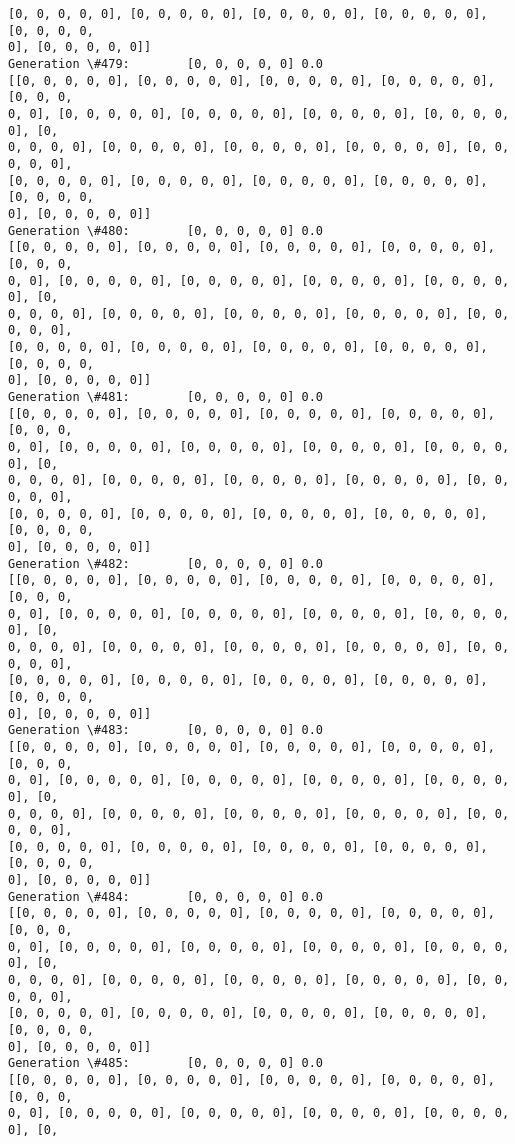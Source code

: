 \documentclass[11pt]{article}
\begin{document}
\begin{Verbatim}[commandchars=\\\{\}]
[0, 0, 0, 0, 0], [0, 0, 0, 0, 0], [0, 0, 0, 0, 0], [0, 0, 0, 0, 0], [0, 0, 0, 0,
0], [0, 0, 0, 0, 0]]
Generation \#479:        [0, 0, 0, 0, 0] 0.0
[[0, 0, 0, 0, 0], [0, 0, 0, 0, 0], [0, 0, 0, 0, 0], [0, 0, 0, 0, 0], [0, 0, 0,
0, 0], [0, 0, 0, 0, 0], [0, 0, 0, 0, 0], [0, 0, 0, 0, 0], [0, 0, 0, 0, 0], [0,
0, 0, 0, 0], [0, 0, 0, 0, 0], [0, 0, 0, 0, 0], [0, 0, 0, 0, 0], [0, 0, 0, 0, 0],
[0, 0, 0, 0, 0], [0, 0, 0, 0, 0], [0, 0, 0, 0, 0], [0, 0, 0, 0, 0], [0, 0, 0, 0,
0], [0, 0, 0, 0, 0]]
Generation \#480:        [0, 0, 0, 0, 0] 0.0
[[0, 0, 0, 0, 0], [0, 0, 0, 0, 0], [0, 0, 0, 0, 0], [0, 0, 0, 0, 0], [0, 0, 0,
0, 0], [0, 0, 0, 0, 0], [0, 0, 0, 0, 0], [0, 0, 0, 0, 0], [0, 0, 0, 0, 0], [0,
0, 0, 0, 0], [0, 0, 0, 0, 0], [0, 0, 0, 0, 0], [0, 0, 0, 0, 0], [0, 0, 0, 0, 0],
[0, 0, 0, 0, 0], [0, 0, 0, 0, 0], [0, 0, 0, 0, 0], [0, 0, 0, 0, 0], [0, 0, 0, 0,
0], [0, 0, 0, 0, 0]]
Generation \#481:        [0, 0, 0, 0, 0] 0.0
[[0, 0, 0, 0, 0], [0, 0, 0, 0, 0], [0, 0, 0, 0, 0], [0, 0, 0, 0, 0], [0, 0, 0,
0, 0], [0, 0, 0, 0, 0], [0, 0, 0, 0, 0], [0, 0, 0, 0, 0], [0, 0, 0, 0, 0], [0,
0, 0, 0, 0], [0, 0, 0, 0, 0], [0, 0, 0, 0, 0], [0, 0, 0, 0, 0], [0, 0, 0, 0, 0],
[0, 0, 0, 0, 0], [0, 0, 0, 0, 0], [0, 0, 0, 0, 0], [0, 0, 0, 0, 0], [0, 0, 0, 0,
0], [0, 0, 0, 0, 0]]
Generation \#482:        [0, 0, 0, 0, 0] 0.0
[[0, 0, 0, 0, 0], [0, 0, 0, 0, 0], [0, 0, 0, 0, 0], [0, 0, 0, 0, 0], [0, 0, 0,
0, 0], [0, 0, 0, 0, 0], [0, 0, 0, 0, 0], [0, 0, 0, 0, 0], [0, 0, 0, 0, 0], [0,
0, 0, 0, 0], [0, 0, 0, 0, 0], [0, 0, 0, 0, 0], [0, 0, 0, 0, 0], [0, 0, 0, 0, 0],
[0, 0, 0, 0, 0], [0, 0, 0, 0, 0], [0, 0, 0, 0, 0], [0, 0, 0, 0, 0], [0, 0, 0, 0,
0], [0, 0, 0, 0, 0]]
Generation \#483:        [0, 0, 0, 0, 0] 0.0
[[0, 0, 0, 0, 0], [0, 0, 0, 0, 0], [0, 0, 0, 0, 0], [0, 0, 0, 0, 0], [0, 0, 0,
0, 0], [0, 0, 0, 0, 0], [0, 0, 0, 0, 0], [0, 0, 0, 0, 0], [0, 0, 0, 0, 0], [0,
0, 0, 0, 0], [0, 0, 0, 0, 0], [0, 0, 0, 0, 0], [0, 0, 0, 0, 0], [0, 0, 0, 0, 0],
[0, 0, 0, 0, 0], [0, 0, 0, 0, 0], [0, 0, 0, 0, 0], [0, 0, 0, 0, 0], [0, 0, 0, 0,
0], [0, 0, 0, 0, 0]]
Generation \#484:        [0, 0, 0, 0, 0] 0.0
[[0, 0, 0, 0, 0], [0, 0, 0, 0, 0], [0, 0, 0, 0, 0], [0, 0, 0, 0, 0], [0, 0, 0,
0, 0], [0, 0, 0, 0, 0], [0, 0, 0, 0, 0], [0, 0, 0, 0, 0], [0, 0, 0, 0, 0], [0,
0, 0, 0, 0], [0, 0, 0, 0, 0], [0, 0, 0, 0, 0], [0, 0, 0, 0, 0], [0, 0, 0, 0, 0],
[0, 0, 0, 0, 0], [0, 0, 0, 0, 0], [0, 0, 0, 0, 0], [0, 0, 0, 0, 0], [0, 0, 0, 0,
0], [0, 0, 0, 0, 0]]
Generation \#485:        [0, 0, 0, 0, 0] 0.0
[[0, 0, 0, 0, 0], [0, 0, 0, 0, 0], [0, 0, 0, 0, 0], [0, 0, 0, 0, 0], [0, 0, 0,
0, 0], [0, 0, 0, 0, 0], [0, 0, 0, 0, 0], [0, 0, 0, 0, 0], [0, 0, 0, 0, 0], [0,

\end{Verbatim}
\end{document}
